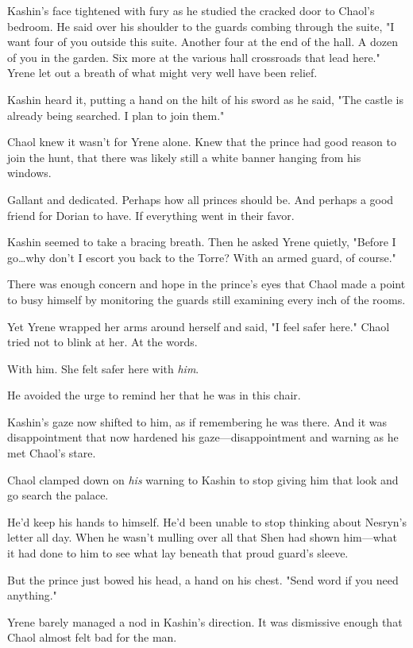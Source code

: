 Kashin's face tightened with fury as he studied the cracked door to Chaol's bedroom.
He said over his shoulder to the guards combing through the suite, "I want four of you outside this suite.
Another four at the end of the hall.
A dozen of you in the garden.
Six more at the various hall crossroads that lead here."
Yrene let out a breath of what might very well have been relief.

Kashin heard it, putting a hand on the hilt of his sword as he said, "The castle is already being searched.
I plan to join them."

Chaol knew it wasn't for Yrene alone.
Knew that the prince had good reason to join the hunt, that there was likely still a white banner hanging from his windows.

Gallant and dedicated.
Perhaps how all princes should be.
And perhaps a good friend for Dorian to have.
If everything went in their favor.

Kashin seemed to take a bracing breath.
Then he asked Yrene quietly, "Before I go\ldots why don't I escort you back to the Torre?
With an armed guard, of course."

There was enough concern and hope in the prince's eyes that Chaol made a point to busy himself by monitoring the guards still examining every inch of the rooms.

Yet Yrene wrapped her arms around herself and said, "I feel safer here."
Chaol tried not to blink at her.
At the words.

With him.
She felt safer here with \emph{him}.

He avoided the urge to remind her that he was in this chair.

Kashin's gaze now shifted to him, as if remembering he was there.
And it was disappointment that now hardened his gaze---disappointment and warning as he met Chaol's stare.

Chaol clamped down on \emph{his} warning to Kashin to stop giving him that look and go search the palace.

He'd keep his hands to himself.
He'd been unable to stop thinking about Nesryn's letter all day.
When he wasn't mulling over all that Shen had shown him---what it had done to him to see what lay beneath that proud guard's sleeve.

But the prince just bowed his head, a hand on his chest.
"Send word if you need anything."

Yrene barely managed a nod in Kashin's direction.
It was dismissive enough that Chaol almost felt bad for the man.

